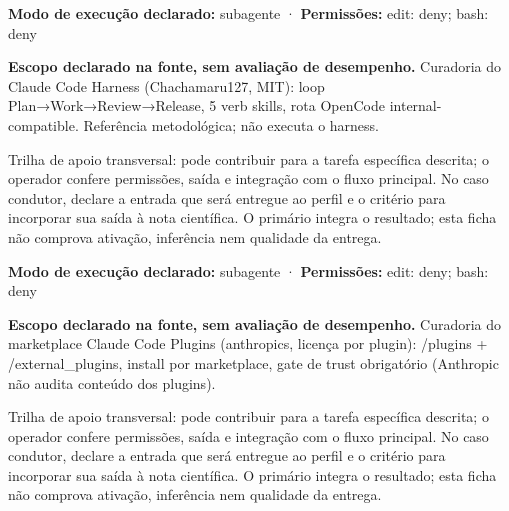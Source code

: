 \begin{arquitetura}
\textbf{Modo de execução declarado:} subagente · \textbf{Permissões:} edit: deny; bash: deny
\end{arquitetura}


\begin{descricao}
\textbf{Escopo declarado na fonte, sem avaliação de desempenho.}
Curadoria do Claude Code Harness (Chachamaru127, MIT): loop Plan→Work→Review→Release, 5 verb skills, rota OpenCode internal-compatible. Referência metodológica; não executa o harness.
\end{descricao}

\begin{funcao}
Trilha de apoio transversal: pode contribuir para a tarefa específica descrita; o operador confere permissões, saída e integração com o fluxo principal. No caso condutor, declare a entrada que será entregue ao perfil e o critério para incorporar sua saída à nota científica. O primário integra o resultado; esta ficha não comprova ativação, inferência nem qualidade da entrega.
\end{funcao}

\begin{arquitetura}
\textbf{Modo de execução declarado:} subagente · \textbf{Permissões:} edit: deny; bash: deny
\end{arquitetura}


\begin{descricao}
\textbf{Escopo declarado na fonte, sem avaliação de desempenho.}
Curadoria do marketplace Claude Code Plugins (anthropics, licença por plugin): /plugins + /external\_plugins, install por marketplace, gate de trust obrigatório (Anthropic não audita conteúdo dos plugins).
\end{descricao}

\begin{funcao}
Trilha de apoio transversal: pode contribuir para a tarefa específica descrita; o operador confere permissões, saída e integração com o fluxo principal. No caso condutor, declare a entrada que será entregue ao perfil e o critério para incorporar sua saída à nota científica. O primário integra o resultado; esta ficha não comprova ativação, inferência nem qualidade da entrega.
\end{funcao}

